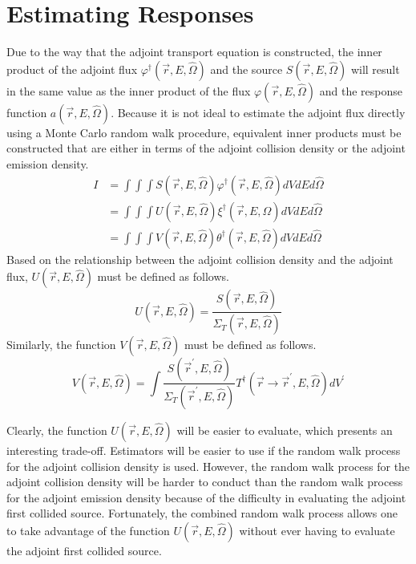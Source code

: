 \section{Estimating Responses}
Due to the way that the adjoint transport equation is constructed, the inner
product of the adjoint flux $\varphi^{\dagger}(\vec{r},E,\hat{\Omega})$ and the
source $S(\vec{r},E,\hat{\Omega})$ will result in the same value as the inner 
product of the flux $\varphi(\vec{r},E,\hat{\Omega})$ and the response
function $a(\vec{r},E,\hat{\Omega})$. Because it is not ideal to estimate the
adjoint flux directly using a Monte Carlo random walk procedure, equivalent
inner products must be constructed that are either in terms of the adjoint
collision density or the adjoint emission density.
\begin{align}
  I & = \int\int\int S(\vec{r},E,\hat{\Omega})\varphi^{\dagger}(\vec{r},E,\hat{\Omega})
  dV dE d\hat{\Omega} \\ 
  & = \int\int\int U(\vec{r},E,\hat{\Omega})\xi^{\dagger}(\vec{r},E,\hat{\Omega})
  dV dE d\hat{\Omega} \\
  & = \int\int\int V(\vec{r},E,\hat{\Omega})\theta^{\dagger}(\vec{r},E,\hat{\Omega})
  dV dE d\hat{\Omega}
  \label{eq:adj_emission_ip}
\end{align}
Based on the relationship between the adjoint collision density and the
adjoint flux, $U(\vec{r},E,\hat{\Omega})$ must be defined as follows.
\begin{equation}
  U(\vec{r},E,\hat{\Omega}) = \frac{S(\vec{r},E,\hat{\Omega})}
                                   {\Sigma_T(\vec{r},E,\hat{\Omega})}
\end{equation}
Similarly, the function $V(\vec{r},E,\hat{\Omega})$ must be defined as follows.
\begin{equation}
  V(\vec{r},E,\hat{\Omega}) = \int \frac{S(\vec{r}^{'},E,\hat{\Omega})}
  {\Sigma_T(\vec{r}^{'},E,\hat{\Omega})} 
  T^{\dagger}(\vec{r} \to \vec{r}^{'},E,\hat{\Omega}) dV^{'}
\end{equation}

Clearly, the function $U(\vec{r},E,\hat{\Omega})$ will be easier to evaluate,
which presents an interesting trade-off. Estimators will be easier to use if
the random walk process for the adjoint collision density is used. However, 
the random walk process for the adjoint collision density will be harder to 
conduct than the random walk process for the adjoint emission density because
of the difficulty in evaluating the adjoint first collided source. Fortunately,
the combined random walk process allows one to take advantage of the function
$U(\vec{r},E,\hat{\Omega})$ without ever having to evaluate the adjoint first 
collided source. 


